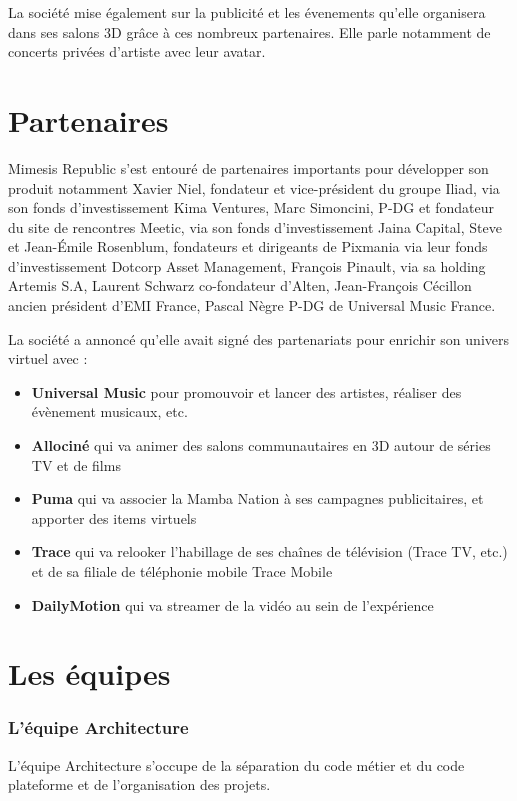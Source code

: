 La société mise également sur la publicité et les évenements qu'elle organisera
dans ses salons 3D grâce à ces nombreux partenaires. Elle parle notamment de
concerts privées d'artiste avec leur avatar.

\section{Partenaires}

Mimesis Republic s'est entouré de partenaires importants pour développer son
produit notamment Xavier Niel, fondateur et vice-président du groupe Iliad, via
son fonds d’investissement Kima Ventures, Marc Simoncini, P-DG et fondateur du
site de rencontres Meetic, via son fonds d'investissement Jaina Capital, Steve
et Jean-Émile Rosenblum, fondateurs et dirigeants de Pixmania via leur fonds
d'investissement Dotcorp Asset Management, François Pinault, via sa holding
Artemis S.A, Laurent Schwarz co-fondateur d'Alten, Jean-François Cécillon ancien
président d'EMI France, Pascal Nègre P-DG de Universal Music France.

La société a annoncé qu'elle avait signé des partenariats pour enrichir son
univers virtuel avec :
\begin{itemize}
\item[\textbullet]\textbf{Universal Music} pour promouvoir et lancer des artistes,
  réaliser des évènement musicaux, etc.
\item[\textbullet]\textbf{Allociné} qui va animer des salons communautaires en
  3D autour de séries TV et de films
\item[\textbullet]\textbf{Puma} qui va associer la Mamba Nation à ses
  campagnes publicitaires, et apporter des items virtuels
\item[\textbullet]\textbf{Trace} qui va relooker l'habillage de ses chaînes de
  télévision (Trace TV, etc.) et de sa filiale de téléphonie mobile Trace
  Mobile
\item[\textbullet]\textbf{DailyMotion} qui va streamer de la vidéo au sein de
  l’expérience
\end{itemize}


\section{Les équipes}

\subsubsection{L'équipe Architecture}
L'équipe Architecture s'occupe de la séparation du code métier et du code
plateforme et de l'organisation des projets.

